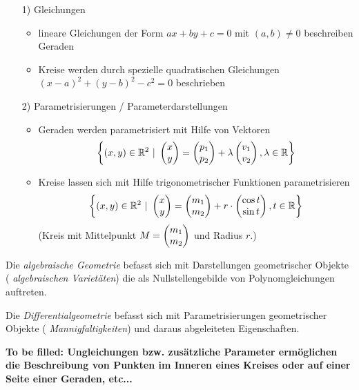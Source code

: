 \begin{enumerate}
\item[1)] Gleichungen

\begin{itemize}
\item lineare Gleichungen der Form $a x + b y + c = 0$ mit $(a,b) \not = 0$ beschreiben Geraden
\item Kreise werden durch spezielle quadratischen Gleichungen $(x-a)^2 + (y-b)^2 - c^2 = 0$
beschrieben


\end{itemize}

\item[2)] Parametrisierungen / Parameterdarstellungen

\begin{itemize}
\item Geraden werden parametrisiert mit Hilfe von Vektoren
$$
	\left\{
		(x,y) \in \mathbb R^2 \ | \ \begin{pmatrix}{x}\\{y}\end{pmatrix} = \begin{pmatrix}{p_1}\\{p_2}\end{pmatrix} + \lambda \begin{pmatrix}{v_1}\\{v_2}\end{pmatrix}, \lambda \in \mathbb R
	\right\}
$$

\item Kreise lassen sich mit Hilfe trigonometrischer Funktionen parametrisieren
$$
	\left\{
		(x,y) \in \mathbb R^2 \ | \ \begin{pmatrix}{x}\\{y}\end{pmatrix} = \begin{pmatrix}{m_1}\\{m_2}\end{pmatrix} + r \cdot \begin{pmatrix}{\cos t}\\{\sin t}\end{pmatrix}, t \in \mathbb R
	\right\}
$$
\hfill (Kreis mit Mittelpunkt $M = \begin{pmatrix}{m_1}\\{m_2}\end{pmatrix}$ und Radius $r$.)
\end{itemize}

\end{enumerate}


Die {\em algebraische Geometrie} befasst sich mit Darstellungen geometrischer Objekte ({\em
algebraischen Varietäten}) die als Nullstellengebilde von Polynomgleichungen auftreten.

Die {\em Differentialgeometrie} befasst sich mit Parametrisierungen geometrischer Objekte ({\em
Mannigfaltigkeiten}) und daraus abgeleiteten Eigenschaften.%

\medskip

{\bf To be filled: Ungleichungen bzw. zusätzliche Parameter ermöglichen die Beschreibung von Punkten
im Inneren eines Kreises oder auf einer Seite einer Geraden, etc...}

